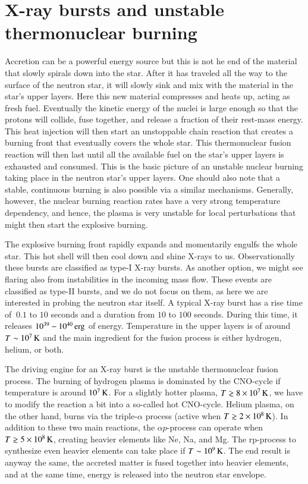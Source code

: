 \section{X-ray bursts and unstable thermonuclear burning}\label{sect:bursts}

Accretion can be a powerful energy source but this is not he end of the material that slowly spirals down into the star.
After it has traveled all the way to the surface of the neutron star, it will slowly sink and mix with the material in the star's upper layers.
Here this new material compresses and heats up, acting as fresh fuel.
Eventually the kinetic energy of the nuclei is large enough so that the protons will collide, fuse together, and release a fraction of their rest-mass energy.
This heat injection will then start an unstoppable chain reaction that creates a burning front that eventually covers the whole star.
This thermonuclear fusion reaction will then last until all the available fuel on the star's upper layers is exhausted and consumed.
This is the basic picture of an unstable nuclear burning taking place in the neutron star's upper layers.
One should also note that a stable, continuous burning is also possible via a similar mechanisms. 
Generally, however, the nuclear burning reaction rates have a very strong temperature dependency, and hence, the plasma is very unstable for local perturbations that might then start the explosive burning.

The explosive burning front rapidly expands and momentarily engulfs the whole star.
This hot shell will then cool down and shine X-rays to us.
Observationally these bursts are classified as type-I X-ray bursts.\cite[see e.g.,][for a review]{Lewin93, SB10}
As another option, we might see flaring also from instabilities in the incoming mass flow. 
These events are classified as type-II bursts, and we do not focus on them, as here we are interested in probing the neutron star itself.
A typical X-ray burst has a rise time of $~0.1$ to $10$ seconds and a duration from $10$ to $100$ seconds.
During this time, it releases $10^{39} - 10^{40} \, \mathrm{erg}$ of energy.
Temperature in the upper layers is of around $T \sim 10^7 \, \mathrm{K}$ and the main ingredient for the fusion process is either hydrogen, helium, or both.

The driving engine for an X-ray burst is the unstable thermonuclear fusion process.\cite{Fujimoto81, Wallace81, Fisker08}
The burning of hydrogen plasma is dominated by the CNO-cycle if temperature is around $10^7 \, \mathrm{K}$.
For a slightly hotter plasma, $T \gtrsim 8 \times 10^{7} \, \mathrm{K}$, we have to modify the reaction a bit into a so-called hot CNO-cycle.\cite{FH65}
Helium plasma, on the other hand, burns via the triple-$\alpha$ process (active when $T \gtrsim 2 \times 10^{8} \, \mathrm{K}$).
In addition to these two main reactions, the $\alpha p$-process can operate when $T \gtrsim 5 \times 10^{8} \, \mathrm{K}$, creating heavier elements like Ne, Na, and Mg.
The rp-process to synthesize even heavier elements can take place if $T \sim 10^9 \, \mathrm{K}$.
The end result is anyway the same, the accreted matter is fused together into heavier elements, and at the same time, energy is released into the neutron star envelope.

